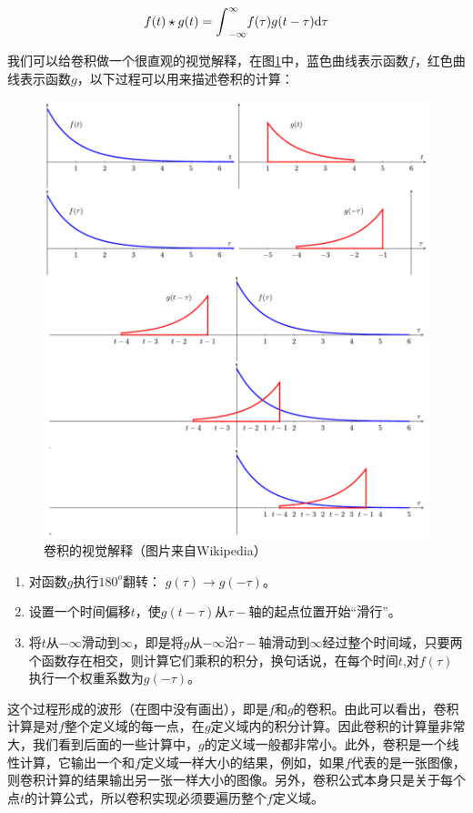 \begin{equation}\label{eq:intro-conv}
	f(t)\star g(t)={\rm \int}^{\infty}_{-\infty}f(\tau)g(t-\tau){\rm d}\tau
\end{equation}



我们可以给卷积做一个很直观的视觉解释，在图\ref{f:intro-Convolution}中，蓝色曲线表示函数$f$，红色曲线表示函数$g$，以下过程可以用来描述卷积的计算：

\begin{figure}
\sidecaption
	\includegraphics[width=.65\textwidth]{figures/intro/Convolution}
	\caption{卷积的视觉解释（图片来自Wikipedia）}
	\label{f:intro-Convolution}
\end{figure}

\begin{enumerate}
	\item 对函数$g$执行$180^{o}$翻转： $g(\tau )\to g(-\tau )$。
	\item 设置一个时间偏移$t$，使$g(t-\tau )$从$\tau-$轴的起点位置开始“滑行”。
	\item 将$t$从$-\infty$滑动到$\infty$，即是将$g$从$-\infty$沿$\tau-$轴滑动到$\infty$经过整个时间域，只要两个函数存在相交，则计算它们乘积的积分，换句话说，在每个时间$t$,对$f(\tau )$执行一个权重系数为$g(-\tau )$。
\end{enumerate}



这个过程形成的波形（在图中没有画出），即是$f$和$g$的卷积。由此可以看出，卷积计算是对$f$整个定义域的每一点，在$g$定义域内的积分计算。因此卷积的计算量非常大，我们看到后面的一些计算中，$g$的定义域一般都非常小。此外，卷积是一个线性计算，它输出一个和$f$定义域一样大小的结果，例如，如果$f$代表的是一张图像，则卷积计算的结果输出另一张一样大小的图像。另外，卷积公式本身只是关于每个点$t$的计算公式，所以卷积实现必须要遍历整个$f$定义域。

